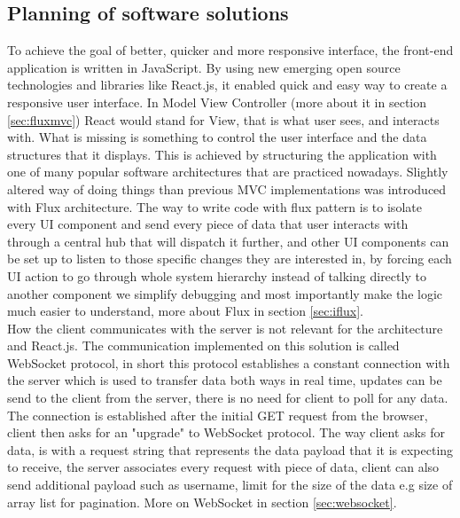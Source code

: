 \subsection{Planning of software solutions}
To achieve the goal of better, quicker and more responsive interface, the front-end application is written in JavaScript. By using new emerging open source technologies and libraries like React.js, it enabled quick and easy way to create a responsive user interface. In Model View Controller (more about it in section \ref{sec:fluxmvc}) React would stand for View, that is what user sees, and interacts with. What is missing is something to control the user interface and the data structures that it displays. This is achieved by structuring the application with one of many popular software architectures that are practiced nowadays. Slightly altered way of doing things than previous MVC implementations was introduced with Flux architecture. The way to write code with flux  pattern is to isolate every UI component and send every piece of data that user interacts with through a central hub that will dispatch it further, and other UI components can be set up to listen to those specific changes they are interested in, by forcing each UI action to go through whole system hierarchy instead of talking directly to another component we simplify debugging and most importantly make the logic much easier to understand, more about Flux in section \ref{sec:iflux}.
\\How the client communicates with the server is not relevant for the architecture and React.js. The communication implemented on this solution is called WebSocket protocol, in short this protocol establishes a constant connection with the server which is used to transfer data both ways in real time, updates can be send to the client from the server, there is no need for client to poll for any data. The connection is established after the initial GET request from the browser, client then asks for an "upgrade" to WebSocket protocol. The way client asks for data, is with a request string that represents the data payload that it is expecting to receive, the server associates every request with piece of data, client can also send additional payload such as username, limit for the size of the data e.g size of array list for pagination. More on WebSocket in section \ref{sec:websocket}.

